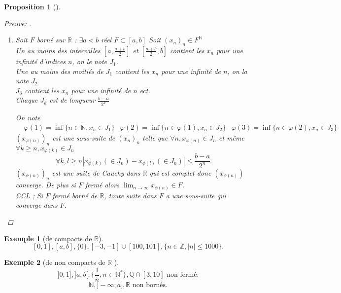 \documentclass{article}
\theoremstyle{plain}%
\newtheorem{prop}[thm]{Proposition}
\theoremstyle{definition}
\newtheorem{exmp}{Exemple}[section]
\theoremstyle{remark}
\newtheorem*{note}{Note}
\begin{document}
\begin{prop}[]
\begin{proof}[Preuve: ]
\begin{enumerate}
\begin{itemize}
                Impossible 
                \begin{note}[]
                    Car on a à gauche tous les entiers et à droite un entier finis, on a trouver un majorant de tous les entiers, ça n'existe pas. 
                \end{note}
            \end{itemize}

            \item Soit $ F $ borné sur $ \mathbb{R} $ : $ \exists a<b $  réel $ F \subset [a,b] $ Soit $ (x_n)_n \in F^{\mathbb{N}} $ \\
            Un au moins des intervalles $ [a, \frac{a+b}{2}] $ et $ [\frac{a+b}{2}, b] $ contient les $ x_n $ pour une infinité d'indices $ n $, on le note $ J_1 $. \\
            Une au moins des moitiés de $ J_1 $  contient les $ x_n $ pour une infinité de $ n $, on la note $ J_2 $\\
            $ J_3 $ contient les $ x_n $ pour une infinité de $ n $ ect. \\
            Chaque $ J_k $ est de longueur $ \frac{b-a}{2^k} $

            On note \begin{align*}
                & \varphi (1) = \inf \{n \in \mathbb{N}, x_n \in J_1\}
                & \varphi (2) = \inf \{n \in \varphi (1), x_n \in J_2\}
                & \varphi (3) = \inf \{n \in \varphi (2), x_n \in J_3\}
            \end{align*}
            $ (x_{\varphi (n)})_n $ est une sous-suite de $ (x_n)_n $ telle que  $ \forall n, x_{\varphi (n)} \in J_n $ et même $ \forall k \geq n, x_{\varphi (k)} \in J_n $ 
            \[
                \forall k,l \geq n \left| x_{\phi (k)} (\in J_n) - x_{\phi (l)} (\in J_n) \right| \leq \frac{b-a}{2^n}
            .\]
            $ (x_{\phi (n)})_n $ est une suite de Cauchy dans $ \mathbb{R} $ qui est complet donc $ (x_{\phi (n)}) $ converge. De plus si $ F $ fermé alors $ \lim_{n \to \infty} x_{\phi (n)} \in F $. \\
            CCL ; Si $ F $ fermé borné de $ \mathbb{R} $, toute suite dans $ F $ a une sous-suite qui converge dans $ F $.            
        \end{enumerate}
    \end{proof}
\end{prop}

\begin{exmp}[de compacts de $\mathbb{R}$]
    \[
        [0,1], [a,b], \{0\}, [-3, -1] \cup [100,101], \{n \in \mathbb{Z}, \left| n \right| \leq 1000\}
    .\]
\end{exmp}
\begin{exmp}[de non compacts de $ \mathbb{R} $ ]
    \[
        ]0,1], ]a,b[, \{\frac{1}{n}, n \in \mathbb{N}^*\}, \mathbb{Q} \cap [3,10] \text{ non fermé}
    .\]
    \[
        \mathbb{N}, ]-\infty ; a], \mathbb{R} \text{ non bornés}
    .\]
\end{exmp}
\end{document}
